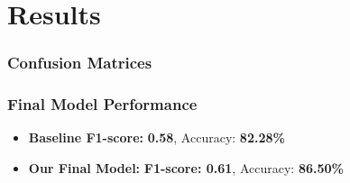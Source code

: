 \section{Results}
\label{sec:results}

\begin{frame}
    \frametitle{Confusion Matrices}
\end{frame}

\begin{frame}
    \frametitle{Final Model Performance}
    \begin{itemize}
        \item \textbf{Baseline F1-score:} \textbf{0.58}, Accuracy: \textbf{82.28\%}
        \item \textbf{Our Final Model:} \textbf{F1-score: 0.61}, Accuracy: \textbf{86.50\%}
    \end{itemize}
\end{frame}